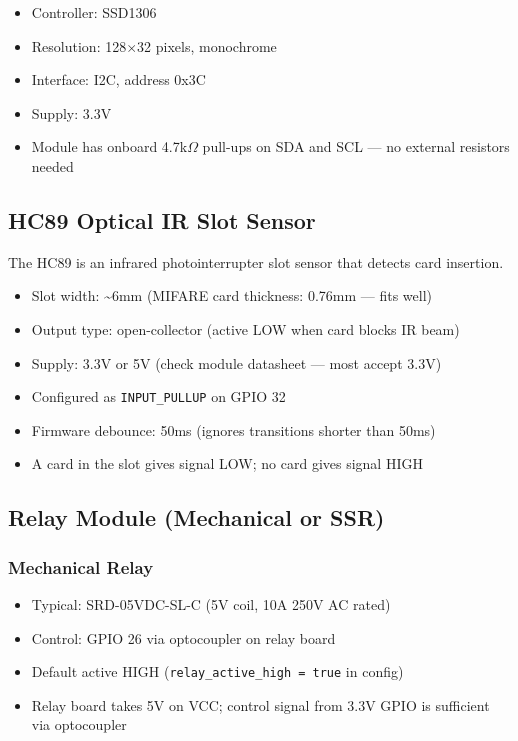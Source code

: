 \begin{itemize}[leftmargin=1.5em]
    \item Controller: SSD1306
    \item Resolution: 128$\times$32 pixels, monochrome
    \item Interface: I2C, address 0x3C
    \item Supply: 3.3V
    \item Module has onboard 4.7k$\Omega$ pull-ups on SDA and SCL --- no external resistors needed
\end{itemize}

\subsection{HC89 Optical IR Slot Sensor}

The HC89 is an infrared photointerrupter slot sensor that detects card insertion.

\begin{itemize}[leftmargin=1.5em]
    \item Slot width: \textasciitilde{}6mm (MIFARE card thickness: 0.76mm --- fits well)
    \item Output type: open-collector (active LOW when card blocks IR beam)
    \item Supply: 3.3V or 5V (check module datasheet --- most accept 3.3V)
    \item Configured as \texttt{INPUT\_PULLUP} on GPIO 32
    \item Firmware debounce: 50ms (ignores transitions shorter than 50ms)
    \item A card in the slot gives signal LOW; no card gives signal HIGH
\end{itemize}

\subsection{Relay Module (Mechanical or SSR)}

\subsubsection{Mechanical Relay}
\begin{itemize}[leftmargin=1.5em]
    \item Typical: SRD-05VDC-SL-C (5V coil, 10A 250V AC rated)
    \item Control: GPIO 26 via optocoupler on relay board
    \item Default active HIGH (\texttt{relay\_active\_high = true} in config)
    \item Relay board takes 5V on VCC; control signal from 3.3V GPIO is sufficient via optocoupler
\end{itemize}


